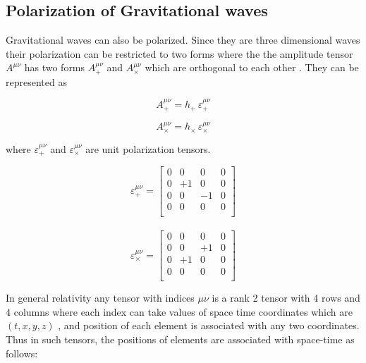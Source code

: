 \subsection{Polarization of Gravitational waves}


Gravitational waves can also be polarized. Since they are three dimensional waves their polarization can be restricted to two forms where the the amplitude tensor $A^{\mu\nu}$ has two forms $A^{\mu\nu}_{+}$ and $A^{\mu\nu}_{\times}$ which are orthogonal to each other \cite{Dirkes_2018}. They can be represented as 

\begin{equation}
    A^{\mu\nu}_{+} = h_{+}\, \varepsilon^{\mu\nu}_{+}
\end{equation}

\begin{equation}
    A^{\mu\nu}_{\times} = h_{\times} \,\varepsilon^{\mu\nu}_{\times}
\end{equation}

\noindent where $\varepsilon^{\mu\nu}_{+}$ and $\varepsilon^{\mu\nu}_{\times}$ are unit polarization tensors.

\begin{equation}
\varepsilon^{\mu\nu}_{+} =
\begin{bmatrix}
0 & 0 & 0 & 0 \\
0 & +1 & 0 & 0 \\
0 & 0 & -1 & 0 \\
0 & 0 & 0 & 0 \\
\end{bmatrix}
\end{equation}
\\
\begin{equation}
\varepsilon^{\mu\nu}_{\times} =
\begin{bmatrix}
0 & 0 & 0 & 0 \\
0 & 0 & +1 & 0 \\
0 & +1 & 0 & 0 \\
0 & 0 & 0 & 0 \\
\end{bmatrix}
\end{equation}

\noindent In general relativity any tensor with indices $\mu\nu$ is a rank 2 tensor with 4 rows and 4 columns where each index can take values of space time coordinates which are $(t,x,y,z)$ , and position of each element is associated with any two coordinates. Thus in such tensors, the positions of elements are associated with space-time as follows:

